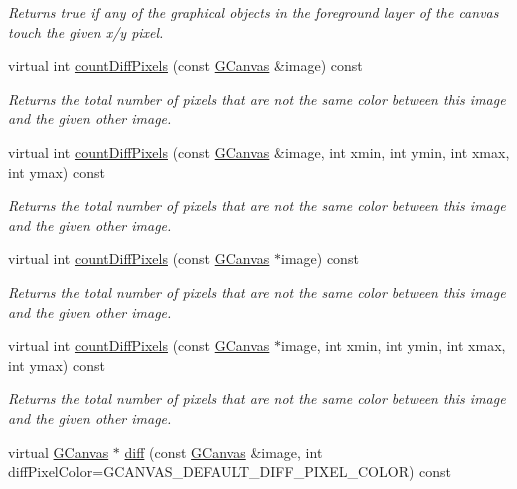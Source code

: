 \begin{DoxyCompactItemize}
\begin{DoxyCompactList}\small\item\em Returns true if any of the graphical objects in the foreground layer of the canvas touch the given x/y pixel. \end{DoxyCompactList}\item 
virtual int \mbox{\hyperlink{classGCanvas_ad3d6147a5e08ed97bb71c7f267ef071b}{count\+Diff\+Pixels}} (const \mbox{\hyperlink{classGCanvas}{G\+Canvas}} \&image) const
\begin{DoxyCompactList}\small\item\em Returns the total number of pixels that are not the same color between this image and the given other image. \end{DoxyCompactList}\item 
virtual int \mbox{\hyperlink{classGCanvas_a3ed6edef8ed522bbfc09d8f6005d6d8e}{count\+Diff\+Pixels}} (const \mbox{\hyperlink{classGCanvas}{G\+Canvas}} \&image, int xmin, int ymin, int xmax, int ymax) const
\begin{DoxyCompactList}\small\item\em Returns the total number of pixels that are not the same color between this image and the given other image. \end{DoxyCompactList}\item 
virtual int \mbox{\hyperlink{classGCanvas_a443b0f63a197c0f1147b13077f4206e0}{count\+Diff\+Pixels}} (const \mbox{\hyperlink{classGCanvas}{G\+Canvas}} $\ast$image) const
\begin{DoxyCompactList}\small\item\em Returns the total number of pixels that are not the same color between this image and the given other image. \end{DoxyCompactList}\item 
virtual int \mbox{\hyperlink{classGCanvas_a77b38a94630c93ecc697fb12a1fb89fd}{count\+Diff\+Pixels}} (const \mbox{\hyperlink{classGCanvas}{G\+Canvas}} $\ast$image, int xmin, int ymin, int xmax, int ymax) const
\begin{DoxyCompactList}\small\item\em Returns the total number of pixels that are not the same color between this image and the given other image. \end{DoxyCompactList}\item 
virtual \mbox{\hyperlink{classGCanvas}{G\+Canvas}} $\ast$ \mbox{\hyperlink{classGCanvas_aa4e74e40eebb70c9616065056de5c4ca}{diff}} (const \mbox{\hyperlink{classGCanvas}{G\+Canvas}} \&image, int diff\+Pixel\+Color=G\+C\+A\+N\+V\+A\+S\+\_\+\+D\+E\+F\+A\+U\+L\+T\+\_\+\+D\+I\+F\+F\+\_\+\+P\+I\+X\+E\+L\+\_\+\+C\+O\+L\+OR) const

\end{DoxyCompactItemize}
